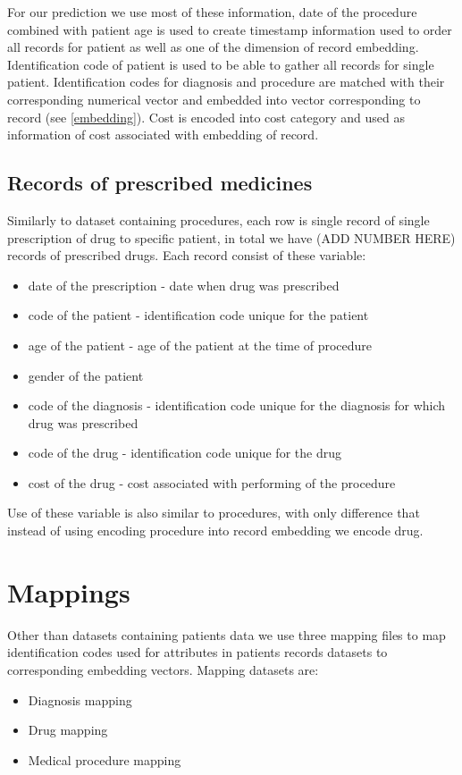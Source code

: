 For our prediction we use most of these information, date of the procedure combined with patient age is used to create timestamp information used to order all records for patient as well as one of the dimension of record embedding. Identification code of patient is used to be able to gather all records for single patient. Identification codes for diagnosis and procedure are matched with their corresponding numerical vector and embedded into vector corresponding to record (see \ref{embedding}). Cost is encoded into cost category and used as information of cost associated with embedding of record.

\subsection{Records of prescribed medicines}

Similarly to dataset containing procedures, each row is single record of single prescription of drug to specific patient, in total we have (ADD NUMBER HERE) records of prescribed drugs. Each record consist of these variable:
\begin{itemize}
	\item date of the prescription - date when drug was prescribed
	\item code of the patient - identification code unique for the patient
	\item age of the patient - age of the patient at the time of procedure
	\item gender of the patient
	\item code of the diagnosis - identification code unique for the diagnosis for which drug was prescribed
	\item code of the drug - identification code unique for the drug 
	\item cost of the drug - cost associated with performing of the procedure
\end{itemize}

Use of these variable is also similar to procedures, with only difference that instead of using encoding procedure into record embedding we encode drug.

\section{Mappings}

Other than datasets containing patients data we use three mapping files to map identification codes used for attributes in patients records datasets to corresponding embedding vectors. Mapping datasets are:
\begin{itemize}
	\item Diagnosis mapping
	\item Drug mapping
	\item Medical procedure mapping
\end{itemize}

